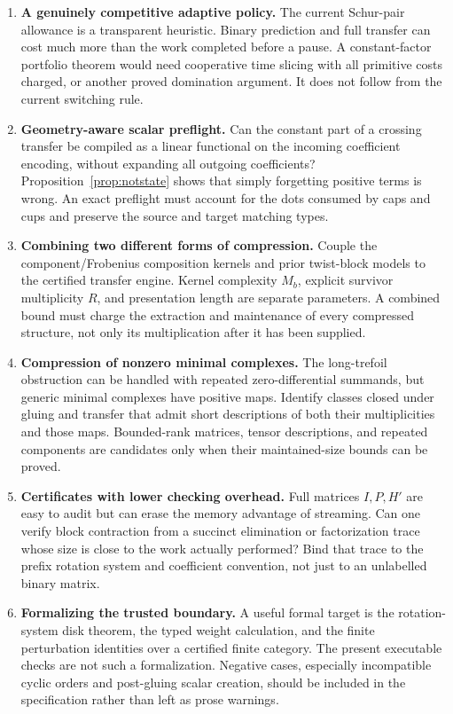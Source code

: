\documentclass[11pt]{article}
\theoremstyle{definition}\newtheorem{definition}[theorem]{Definition}
\theoremstyle{remark}\newtheorem{remark}[theorem]{Remark}
\begin{document}
\begin{enumerate}[label=\textbf{Q\arabic*.},leftmargin=2.8em,itemsep=7pt]
\item \textbf{A genuinely competitive adaptive policy.}
The current Schur-pair allowance is a transparent heuristic. Binary prediction
and full transfer can cost much more than the work completed before a pause.
A constant-factor portfolio theorem would need cooperative time slicing with
all primitive costs charged, or another proved domination argument. It does
not follow from the current switching rule.

\item \textbf{Geometry-aware scalar preflight.}
Can the constant part of a crossing transfer be compiled as a linear functional
on the incoming coefficient encoding, without expanding all outgoing coefficients?
Proposition~\ref{prop:notstate} shows that simply forgetting positive terms is
wrong. An exact preflight must account for the dots consumed by caps and cups
and preserve the source and target matching types.

\item \textbf{Combining two different forms of compression.}
Couple the component/Frobenius composition kernels and prior twist-block models
to the certified transfer engine. Kernel complexity $M_b$, explicit survivor
multiplicity $R$, and presentation length are separate parameters. A combined
bound must charge the extraction and maintenance of every compressed structure,
not only its multiplication after it has been supplied.

\item \textbf{Compression of nonzero minimal complexes.}
The long-trefoil obstruction can be handled with repeated zero-differential
summands, but generic minimal complexes have positive maps. Identify classes
closed under gluing and transfer that admit short descriptions of both their
multiplicities and those maps. Bounded-rank matrices, tensor descriptions, and
repeated components are candidates only when their maintained-size bounds can
be proved.

\item \textbf{Certificates with lower checking overhead.}
Full matrices $I,P,H'$ are easy to audit but can erase the memory advantage of
streaming. Can one verify block contraction from a succinct elimination or
factorization trace whose size is close to the work actually performed? Bind
that trace to the prefix rotation system and coefficient convention, not just
to an unlabelled binary matrix.

\item \textbf{Formalizing the trusted boundary.}
A useful formal target is the rotation-system disk theorem, the typed weight
calculation, and the finite perturbation identities over a certified finite
category. The present executable checks are not such a formalization. Negative
cases, especially incompatible cyclic orders and post-gluing scalar creation,
should be included in the specification rather than left as prose warnings.


\end{enumerate}
\end{document}
